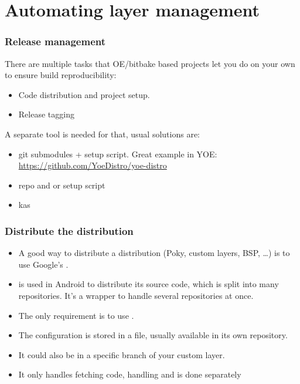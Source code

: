 \section{Automating layer management}

\begin{frame}[fragile]
  \frametitle{Release management}
  There are multiple tasks that OE/bitbake based projects let you do
  on your own to ensure build reproducibility:
  \begin{itemize}
  \item Code distribution and project setup.
  \item Release tagging
  \end{itemize}
  A separate tool is needed for that, usual solutions are:
  \begin{itemize}
  \item git submodules + setup script. Great example in YOE:
    \url{https://github.com/YoeDistro/yoe-distro}
  \item repo and  or setup script
  \item kas
  \end{itemize}
\end{frame}

\begin{frame}
  \frametitle{Distribute the distribution}
  \begin{itemize}
    \item A good way to distribute a distribution (Poky, custom
      layers, BSP, \dots) is to use Google's
      .
    \item {} is used in Android to distribute its source
      code, which is split into many  repositories. It's a
      wrapper to handle several  repositories at once.
    \item The only requirement is to use .
    \item The  configuration is stored in a 
      file, usually available in its own  repository.
  \item It could also be in a specific branch of your custom layer.
  \item It only handles fetching code, handling  and
     is done separately
  \end{itemize}
\end{frame}

